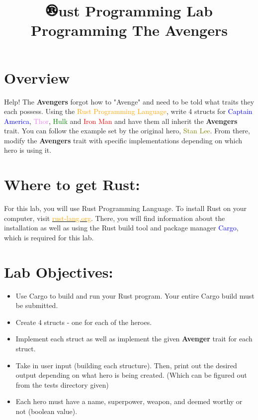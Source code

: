 \documentclass[11pt]{article}
\begin{document}

\title{\includegraphics[width=0.05\textwidth]{rust_logo.png}ust Programming Lab \\ {\sc Programming The Avengers}}
\date{}
\maketitle
\section*{Overview}
Help! The \textbf{Avengers} forgot how to "Avenge" and need to be told what traits they each possess. 
Using the \textcolor{orange}{Rust Programming Language}, write 4 structs for \textcolor{blue}{Captain America}, \textcolor{violet}{Thor}, \textcolor{green}{Hulk} and \textcolor{red}{Iron Man} and have them all inherit the \textbf{Avengers} trait. You can follow the example set by the original hero, \textcolor{olive}{Stan Lee}. From there, modify the \textbf{Avengers} trait with specific implementations depending on which hero is using it. 

\section*{Where to get Rust:}
For this lab, you will use Rust Programming Language. To install Rust on your computer, visit \href{https://www.rust-lang.org/learn/get-started}{\textcolor{orange}{rust-lang.org}}. There, you will find information about the installation as well as using the Rust build tool and package manager \textcolor{blue}{Cargo}, which is required for this lab.

\section*{Lab Objectives:}

\begin{itemize}
    \item Use Cargo to build and run your Rust program. Your entire Cargo build must be submitted.
    \item Create 4 structs - one for each of the heroes.
    \item Implement each struct as well as implement the given \textbf{Avenger} trait for each struct.
    \item Take in user input (building each structure). Then, print out the desired output depending on what hero is being created. (Which can be figured out from the tests directory given) 
    \item Each hero must have a name, superpower, weapon, and deemed worthy or not (boolean value). 
\end{itemize}
\bigskip
\end{document}
